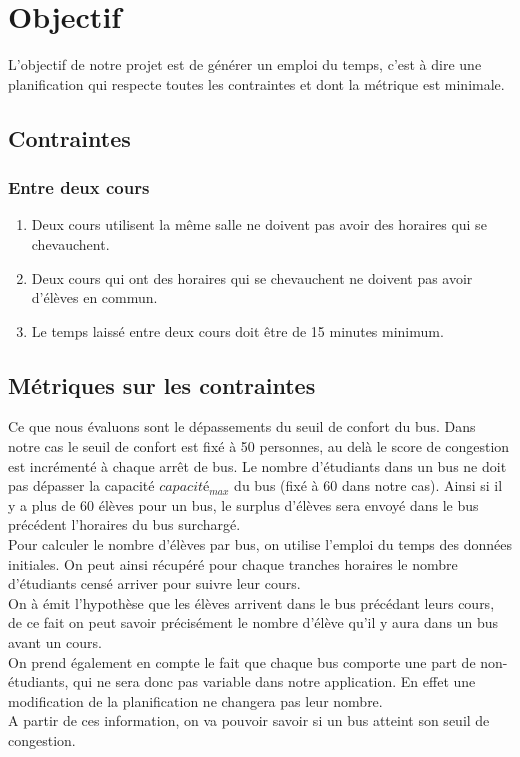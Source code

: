 \documentclass[a4paper,11pt]{article}
\begin{document}
\section{Objectif}
	L'objectif de notre projet est de générer un emploi du temps, c'est à dire une planification qui respecte toutes les contraintes et dont la métrique est minimale.
	\subsection{Contraintes}
		\subsubsection{Entre deux cours}
				\begin{enumerate}
					\item Deux cours utilisent la même salle ne doivent pas avoir des horaires qui se chevauchent.
					\item Deux cours qui ont des horaires qui se chevauchent ne doivent pas avoir d'élèves en commun.
					\item Le temps laissé entre deux cours doit être de 15 minutes minimum.
				\end{enumerate}
	
	\subsection{Métriques sur les contraintes}
		Ce que nous évaluons sont le dépassements du seuil de confort du bus. Dans notre cas le seuil de confort est fixé à 50 personnes, au delà le score de congestion est incrémenté à chaque arrêt de bus.
		Le nombre d'étudiants dans un bus ne doit pas dépasser la capacité $capacité_{max}$ du bus (fixé à 60 dans notre cas). Ainsi si il y a plus de 60 élèves pour un bus, le surplus d'élèves sera envoyé dans le bus précédent l'horaires du bus surchargé.\\
		Pour calculer le nombre d'élèves par bus, on utilise l'emploi du temps des données initiales. On peut ainsi récupéré pour chaque tranches horaires le nombre d'étudiants censé arriver pour suivre leur cours.\\
		On à émit l'hypothèse que les élèves arrivent dans le bus précédant leurs cours, de ce fait on peut savoir précisément le nombre d'élève qu'il y aura dans un bus avant un cours.\\
		On prend également en compte le fait que chaque bus comporte une part de non-étudiants, qui ne sera donc pas variable dans notre application. En effet une modification de la planification ne changera pas leur nombre.\\
		A partir de ces information, on va pouvoir savoir si un bus atteint son seuil de congestion.
		
\end{document}
